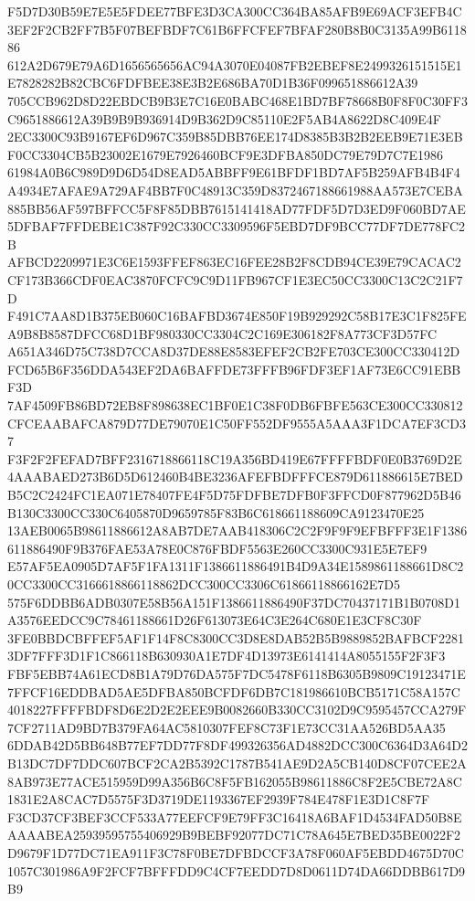 \documentclass[UTF8,fontset=fandol,zihao=-4,a4paper]{ctexart}
\begin{document}
{{F5D7D30B59E7E5E5FDEE77BFE3D3CA300CC364BA85AFB9E69ACF3EFB4C3EF2F2CB2FF7B5F07BEFBDF7C61B6FFCFEF7BFAF280B8B0C3135A99B611886
612A2D679E79A6D1656565656AC94A3070E04087FB2EBEF8E2499326151515E1E7828282B82CBC6FDFBEE38E3B2E686BA70D1B36F099651886612A39
705CCB962D8D22EBDCB9B3E7C16E0BABC468E1BD7BF78668B0F8F0C30FF3C9651886612A39B9B9B936914D9B362D9C85110E2F5AB4A8622D8C409E4F
2EC3300C93B9167EF6D967C359B85DBB76EE174D8385B3B2B2EEB9E71E3EBF0CC3304CB5B23002E1679E7926460BCF9E3DFBA850DC79E79D7C7E1986
61984A0B6C989D9D6D54D8EAD5ABBFF9E61BFDF1BD7AF5B259AFB4B4F4A4934E7AFAE9A729AF4BB7F0C48913C359D8372467188661988AA573E7CEBA
885BB56AF597BFFCC5F8F85DBB7615141418AD77FDF5D7D3ED9F060BD7AE5DFBAF7FFDEBE1C387F92C330CC3309596F5EBD7DF9BCC77DF7DE778FC2B
AFBCD2209971E3C6E1593FFEF863EC16FEE28B2F8CDB94CE39E79CACAC2CF173B366CDF0EAC3870FCFC9C9D11FB967CF1E3EC50CC3300C13C2C21F7D
F491C7AA8D1B375EB060C16BAFBD3674E850F19B929292C58B17E3C1F825FEA9B8B8587DFCC68D1BF980330CC3304C2C169E306182F8A773CF3D57FC
A651A346D75C738D7CCA8D37DE88E8583EFEF2CB2FE703CE300CC330412DFCD65B6F356DDA543EF2DA6BAFFDE73FFFB96FDF3EF1AF73E6CC91EBBF3D
7AF4509FB86BD72EB8F898638EC1BF0E1C38F0DB6FBFE563CE300CC330812CFCEAABAFCA879D77DE79070E1C50FF552DF9555A5AAA3F1DCA7EF3CD37
F3F2F2FEFAD7BFF2316718866118C19A356BD419E67FFFFBDF0E0B3769D2E4AAABAED273B6D5D612460B4BE3236AFEFBDFFFCE879D611886615E7BED
B5C2C2424FC1EA071E78407FE4F5D75FDFBE7DFB0F3FFCD0F877962D5B46B130C3300CC330C6405870D9659785F83B6C618661188609CA9123470E25
13AEB0065B98611886612A8AB7DE7AAB418306C2C2F9F9F9EFBFFF3E1F1386611886490F9B376FAE53A78E0C876FBDF5563E260CC3300C931E5E7EF9
E57AF5EA0905D7AF5F1FA1311F1386611886491B4D9A34E1589861188661D8C20CC3300CC3166618866118862DCC300CC3306C61866118866162E7D5
575F6DDBB6ADB0307E58B56A151F1386611886490F37DC70437171B1B0708D1A3576EEDCC9C78461188661D26F613073E64C3E264C680E1E3CF8C30F
3FE0BBDCBFFEF5AF1F14F8C8300CC3D8E8DAB52B5B9889852BAFBCF22813DF7FFF3D1F1C866118B630930A1E7DF4D13973E6141414A8055155F2F3F3
FBF5EBB74A61ECD8B1A79D76DA575F7DC5478F6118B6305B9809C19123471E7FFCF16EDDBAD5AE5DFBA850BCFDF6DB7C181986610BCB5171C58A157C
4018227FFFFBDF8D6E2D2E2EEE9B0082660B330CC3102D9C9595457CCA279F7CF2711AD9BD7B379FA64AC5810307FEF8C73F1E73CC31AA526BD5AA35
6DDAB42D5BB648B77EF7DD77F8DF499326356AD4882DCC300C6364D3A64D2B13DC7DF7DDC607BCF2CA2B5392C1787B541AE9D2A5CB140D8CF07CEE2A
8AB973E77ACE515959D99A356B6C8F5FB162055B98611886C8F2E5CBE72A8C1831E2A8CAC7D5575F3D3719DE1193367EF2939F784E478F1E3D1C8F7F
F3CD37CF3BEF3CCF533A77EEFCF9E79FF3C16418A6BAF1D4534FAD50B8EAAAABEA25939595755406929B9BEBF92077DC71C78A645E7BED35BE0022F2
D9679F1D77DC71EA911F3C78F0BE7DFBDCCF3A78F060AF5EBDD4675D70C1057C301986A9F2FCF7BFFFDD9C4CF7EEDD7D8D0611D74DA66DDBB617D9B9
}}
\end{document}
